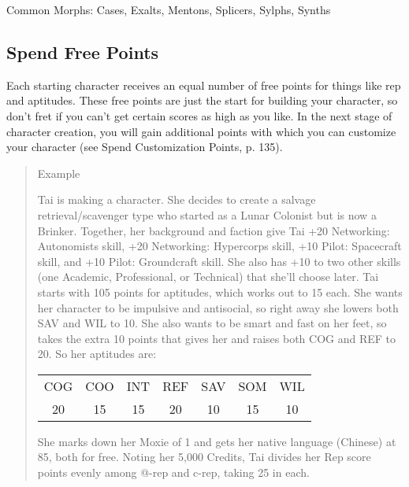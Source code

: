Common Morphs: Cases, Exalts, Mentons, Splicers, Sylphs, Synths

\subsection{Spend Free Points}

Each starting character receives an equal number of free points for things like
rep and aptitudes. These free points are just the start for building your
character, so don’t fret if you can’t get certain scores as high as you
like. In the next stage of character creation, you will gain additional points
with which you can customize your character (see Spend Customization Points,
p. 135).


\begin{quotation}
Example

Tai is making a character. She decides to create a salvage
retrieval/scavenger type who started as a Lunar Colonist but is now a
Brinker. Together, her background and faction give Tai +20 Networking:
Autonomists skill, +20 Networking: Hypercorps skill, +10 Pilot: Spacecraft
skill, and +10 Pilot: Groundcraft skill. She also has +10 to two other skills
(one Academic, Professional, or Technical) that she’ll choose later.  Tai
starts with 105 points for aptitudes, which works out to 15 each. She wants her
character to be impulsive and antisocial, so right away she lowers both SAV and
WIL to 10. She also wants to be smart and fast on her feet, so takes the extra
10 points that gives her and raises both COG and REF to 20. So her aptitudes
are:
 
\begin{center}
  \begin{tabular}{ccccccc}
    COG & COO & INT & REF & SAV & SOM & WIL \\ 
    20 & 15 & 15 & 20 & 10 & 15 & 10 \\ 
  \end{tabular} 
\end{center}

She marks down her Moxie of 1 and gets her native language (Chinese) at 85,
both for free.  Noting her 5,000 Credits, Tai divides her Rep score points
evenly among @-rep and c-rep, taking 25 in each.



\end{quotation}
